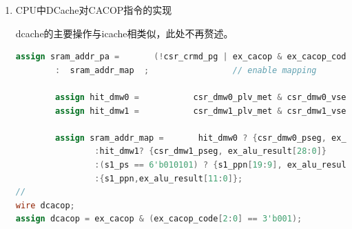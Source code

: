\documentclass[11pt]{article}
\begin{document}
\begin{enumerate}
\begin{lstlisting}[language=verilog]
    \end{lstlisting}

    其中的icacop_complete信号，用来标记ICache的cacop指令是否执行完毕，这是因为op为10时，需要两个周期才能完成，op不为10时需一个周期完成。其代码如下
    \begin{lstlisting}[language=verilog]
        always @(posedge clk) begin
    if (~resetn) begin
        icacop_complete <= 1'b1;
    end
    else if (icacop & cacop_code[4:3] != 2'b10) begin
        icacop_complete <= 1'b1;
    end
    else if (icacop_next & cacop_code[4:3] == 2'b10) begin
        icacop_complete <= 1'b1;
    end
    else  
        icacop_complete <= 1'b0;
    end
    \end{lstlisting}

    当op为10时，需要将cacop指令的虚拟地址s0_vppn, s0_va_bit12传入tlb，代码如下：
    \begin{lstlisting}[language=verilog]
        assign icacop_vaddr = pre_pc & {32{~icacop| cacop_code[4:3]!=2'b10|icacop_complete}}
        | icacop_addr&{32{icacop & ~icacop_complete &cacop_code[4:3]==2'b10}};
        assign {s0_vppn, s0_va_bit12} = icacop_vaddr[31:12];// output to tlb
    \end{lstlisting}
    \item CPU中DCache对CACOP指令的实现
    
    dcache的主要操作与icache相类似，此处不再赘述。

    \begin{lstlisting}[language=verilog]
        assign sram_addr_pa =       (!csr_crmd_pg | ex_cacop & ex_cacop_code == 5'b00001 | ex_cacop & ex_cacop_code == 5'b01001) ? ex_alu_result    // direct translate
        :  sram_addr_map  ;                 // enable mapping
    
        assign hit_dmw0 =           csr_dmw0_plv_met & csr_dmw0_vseg == ex_alu_result[31:29] & ~(dcacop & ex_cacop_code[4:3] != 2'b10);
        assign hit_dmw1 =           csr_dmw1_plv_met & csr_dmw1_vseg == ex_alu_result[31:29] & !hit_dmw0 & ~(dcacop & ex_cacop_code[4:3] != 2'b10);

        assign sram_addr_map =       hit_dmw0 ? {csr_dmw0_pseg, ex_alu_result[28:0]}         // dierct map windows 0
                :hit_dmw1? {csr_dmw1_pseg, ex_alu_result[28:0]}         // direct map windows 1
                :(s1_ps == 6'b010101) ? {s1_ppn[19:9], ex_alu_result[20:0]}   // tlb map: ps 4Mb
                :{s1_ppn,ex_alu_result[11:0]};                             // tlb map : ps 4kb
//
wire dcacop;
assign dcacop = ex_cacop & (ex_cacop_code[2:0] == 3'b001);
    \end{lstlisting}
\end{enumerate}
\end{document}
